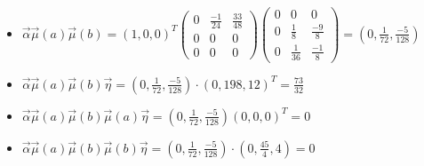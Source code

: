\begin{itemize}
            \item $\overrightarrow{\alpha} \overrightarrow{\mu}(a) \overrightarrow{\mu}(b) =  (1,0,0)^T
                \begin{pmatrix}
                    0 & \frac{-1}{24} & \frac{33}{48} \\
                    0 & 0 & 0 \\
                    0 & 0 & 0 
                \end{pmatrix}
                \begin{pmatrix}
                    0 & 0 & 0 \\
                    0 & \frac{1}{8} & \frac{-9}{8} \\
                    0 & \frac{1}{36} & \frac{-1}{8} 
                \end{pmatrix}
                = ( 0, \frac{1}{72}, \frac{-5}{128})$
                
            \item $\overrightarrow{\alpha} \overrightarrow{\mu}(a) \overrightarrow{\mu}(b) \overrightarrow{\eta} = ( 0, \frac{1}{72}, \frac{-5}{128}) \cdot (0, 198, 12)^T = \frac{73}{32}$
            
            \item $\overrightarrow{\alpha} \overrightarrow{\mu}(a) \overrightarrow{\mu}(b) \overrightarrow{\mu}(a) \overrightarrow{\eta} = ( 0, \frac{1}{72}, \frac{-5}{128}) (0,0,0)^T  = 0$
            
            \item $\overrightarrow{\alpha} \overrightarrow{\mu}(a) \overrightarrow{\mu}(b) \overrightarrow{\mu}(b) \overrightarrow{\eta} = ( 0, \frac{1}{72}, \frac{-5}{128}) \cdot (0, \frac{45}{4}, 4) = 0$
            

\end{itemize}
